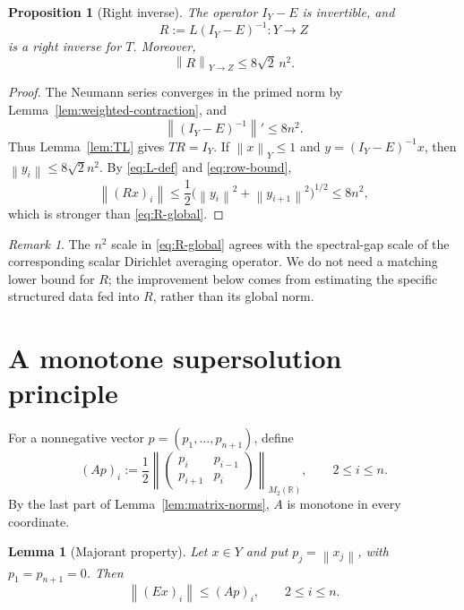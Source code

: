 \documentclass[11pt]{amsart}
\numberwithin{equation}{section}
\newtheorem{proposition}[proposition]{Proposition}
\newtheorem{lemma}[lemma]{Lemma}
\theoremstyle{remark}
\newtheorem{remark}[remark]{Remark}
\newcommand{\norm}[1]{\left\lVert #1\right\rVert}
\begin{document}
\begin{proposition}[Right inverse]\label{prop:right-inverse}
The operator $I_Y-E$ is invertible, and
\begin{equation}\label{eq:R-def}
 R:=L(I_Y-E)^{-1}:Y\to Z
\end{equation}
is a right inverse for $T$.  Moreover,
\begin{equation}\label{eq:R-global}
 \norm R_{Y\to Z}\leq8\sqrt2\,n^2.
\end{equation}
\end{proposition}

\begin{proof}
The Neumann series converges in the primed norm by
Lemma~\ref{lem:weighted-contraction}, and
\[
 \norm{(I_Y-E)^{-1}}'\leq8n^2.
\]
Thus Lemma~\ref{lem:TL} gives $TR=I_Y$.  If $\norm x_Y\leq1$ and
$y=(I_Y-E)^{-1}x$, then
$\norm{y_i}\leq8\sqrt2 n^2$.  By \eqref{eq:L-def} and
\eqref{eq:row-bound},
\[
 \norm{(Rx)_i}
 \leq\frac12\bigl(\norm{y_i}^2+\norm{y_{i+1}}^2\bigr)^{1/2}
 \leq8n^2,
\]
which is stronger than \eqref{eq:R-global}.
\end{proof}

\begin{remark}
The $n^2$ scale in \eqref{eq:R-global} agrees with the spectral-gap scale of
the corresponding scalar Dirichlet averaging operator.  We do not need a
matching lower bound for $R$; the improvement below comes from estimating the
specific structured data fed into $R$, rather than its global norm.
\end{remark}

\section{A monotone supersolution principle}

For a nonnegative vector $p=(p_1,\ldots,p_{n+1})$, define
\begin{equation}\label{eq:A-def}
 (Ap)_i
 :=\frac12\norm{
 \begin{pmatrix}
 p_i&p_{i-1}\\p_{i+1}&p_i
 \end{pmatrix}}_{M_2(\mathbb R)},
 \qquad 2\leq i\leq n.
\end{equation}
By the last part of Lemma~\ref{lem:matrix-norms}, $A$ is monotone in every
coordinate.

\begin{lemma}[Majorant property]\label{lem:majorant}
Let $x\in Y$ and put $p_j=\norm{x_j}$, with $p_1=p_{n+1}=0$.  Then
\[
 \norm{(Ex)_i}\leq(Ap)_i,
 \qquad 2\leq i\leq n.
\]
\end{lemma}
\end{document}
